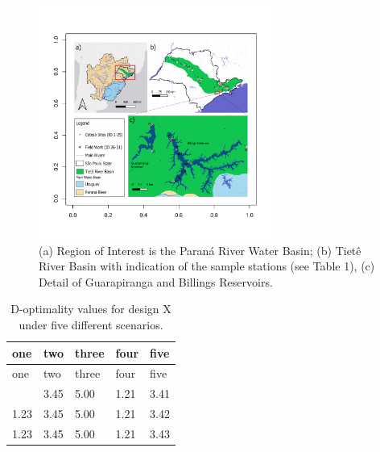 \documentclass[
  12pt]{article}
\begin{document}
\begin{figure}

{\centering \includegraphics[width=3in,height=\textheight]{spalgae.pdf}

}

\caption{\label{fig-first}(a) Region of Interest is the Paraná River
Water Basin; (b) Tietê River Basin with indication of the sample
stations (see Table 1), (c) Detail of Guarapiranga and Billings
Reservoirs.}

\end{figure}

\hypertarget{tbl-one}{}
\begin{longtable}[]{@{}lllll@{}}
\caption{\label{tbl-one}D-optimality values for design X under five
different scenarios.}\tabularnewline
\toprule\noalign{}
one & two & three & four & five \\
\midrule\noalign{}
\endfirsthead
\toprule\noalign{}
one & two & three & four & five \\
\midrule\noalign{}
\endhead
\bottomrule\noalign{}
\endlastfoot
1.23 & 3.45 & 5.00 & 1.21 & 3.41 \\
1.23 & 3.45 & 5.00 & 1.21 & 3.42 \\
1.23 & 3.45 & 5.00 & 1.21 & 3.43 \\
\end{longtable}
\end{document}
